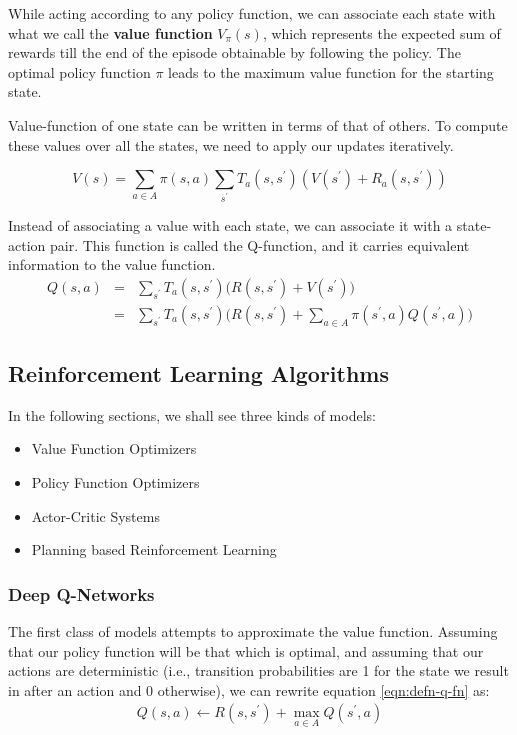While acting according to any policy function, we can associate each state with what we call the \textbf{value function} $V_{\pi}(s)$, which represents the expected sum of rewards till the end of the episode obtainable by following the policy. The optimal policy function $\pi$ leads to the maximum value function for the starting state.

Value-function of one state can be written in terms of that of others. To compute these values over all the states, we need to apply our updates iteratively.

\begin{equation}
    V(s) = \sum_{a \in A} \pi(s, a) \sum_{s^\prime} T_a(s, s^\prime) (V(s^\prime) + R_a(s, s^\prime))
\end{equation}

Instead of associating a value with each state, we can associate it with a state-action pair. This function is called the Q-function, and it carries equivalent information to the value function.
\begin{eqnarray}\label{eqn:defn-q-v-fn}
    Q(s, a) &=& \sum_{s^\prime} T_a(s, s^\prime) \bigg(R(s, s^\prime) + V(s^\prime) \bigg)\\
            &=& \sum_{s^\prime} T_a(s, s^\prime) \bigg(R(s, s^\prime) + \sum_{a \in A} \pi(s^\prime, a) Q(s^\prime, a)\bigg)
\end{eqnarray}

\subsection{Reinforcement Learning Algorithms}

In the following sections, we shall see three kinds of models:
\begin{itemize}
    \item Value Function Optimizers
    \item Policy Function Optimizers
    \item Actor-Critic Systems
    \item Planning based Reinforcement Learning
\end{itemize}


\subsubsection{Deep Q-Networks}

The first class of models attempts to approximate the value function. Assuming that our policy function will be that which is optimal, and assuming that our actions are deterministic (i.e., transition probabilities are 1 for the state we result in after an action and 0 otherwise), we can rewrite equation \ref{eqn:defn-q-fn} as:
\begin{eqnarray}\label{eqn:defn-q-fn}
    Q(s, a) \leftarrow R(s, s^\prime) + \max_{a \in A} Q(s^\prime, a)
\end{eqnarray}

